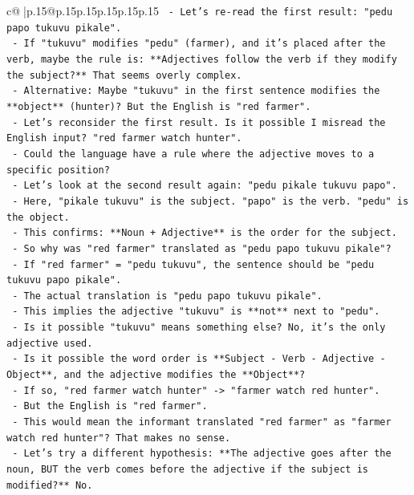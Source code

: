 \documentclass{article}
\begin{document}
{\begin{supertabular}{c@{$\;$}|p{.15\linewidth}@{}p{.15\linewidth}p{.15\linewidth}p{.15\linewidth}p{.15\linewidth}p{.15\linewidth}}
{{{\texttt{     {-} Let's re{-}read the first result: "pedu papo tukuvu pikale".} \\
\texttt{     {-} If "tukuvu" modifies "pedu" (farmer), and it's placed after the verb, maybe the rule is: **Adjectives follow the verb if they modify the subject?** That seems overly complex.} \\
\texttt{     {-} Alternative: Maybe "tukuvu" in the first sentence modifies the **object** (hunter)? But the English is "red farmer".} \\
\texttt{     {-} Let's reconsider the first result. Is it possible I misread the English input? "red farmer watch hunter".} \\
\texttt{     {-} Could the language have a rule where the adjective moves to a specific position?} \\
\texttt{     {-} Let's look at the second result again: "pedu pikale tukuvu papo".} \\
\texttt{     {-} Here, "pikale tukuvu" is the subject. "papo" is the verb. "pedu" is the object.} \\
\texttt{     {-} This confirms: **Noun + Adjective** is the order for the subject.} \\
\texttt{     {-} So why was "red farmer" translated as "pedu papo tukuvu pikale"?} \\
\texttt{     {-} If "red farmer" = "pedu tukuvu", the sentence should be "pedu tukuvu papo pikale".} \\
\texttt{     {-} The actual translation is "pedu papo tukuvu pikale".} \\
\texttt{     {-} This implies the adjective "tukuvu" is **not** next to "pedu".} \\
\texttt{     {-} Is it possible "tukuvu" means something else? No, it's the only adjective used.} \\
\texttt{     {-} Is it possible the word order is **Subject {-} Verb {-} Adjective {-} Object**, and the adjective modifies the **Object**?} \\
\texttt{       {-} If so, "red farmer watch hunter" {-}> "farmer watch red hunter".} \\
\texttt{       {-} But the English is "red farmer".} \\
\texttt{       {-} This would mean the informant translated "red farmer" as "farmer watch red hunter"? That makes no sense.} \\
\texttt{     {-} Let's try a different hypothesis: **The adjective goes after the noun, BUT the verb comes before the adjective if the subject is modified?** No.} \\
}}}
\end{supertabular}}
\end{document}
